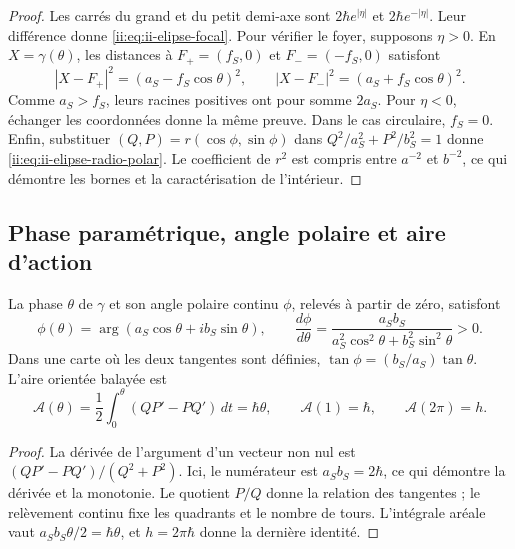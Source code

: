 \begin{proof}
Les carrés du grand et du petit demi-axe sont
\(2\hbar e^{|\eta|}\) et \(2\hbar e^{-|\eta|}\). Leur différence
donne \eqref{ii:eq:ii-elipse-focal}. Pour vérifier le foyer, supposons
\(\eta>0\). En \(X=\gamma(\theta)\), les distances à
\(F_+=(f_S,0)\) et \(F_-=(-f_S,0)\) satisfont
\[
 |X-F_+|^2=(a_S-f_S\cos\theta)^2,\qquad
 |X-F_-|^2=(a_S+f_S\cos\theta)^2.
\]
Comme \(a_S>f_S\), leurs racines positives ont pour somme \(2a_S\).
Pour \(\eta<0\), échanger les coordonnées donne la même preuve.
Dans le cas circulaire, \(f_S=0\). Enfin, substituer
\((Q,P)=r(\cos\phi,\sin\phi)\) dans
\(Q^2/a_S^2+P^2/b_S^2=1\) donne
\eqref{ii:eq:ii-elipse-radio-polar}. Le coefficient de \(r^2\) est
compris entre \(a^{-2}\) et \(b^{-2}\), ce qui démontre les bornes et la
caractérisation de l'intérieur.
\end{proof}

\subsection{Phase paramétrique, angle polaire et aire d'action}
\label{ii:sec:ii-elipse-fase-area}

\begin{proposition}
\label{ii:prop:ii-elipse-area}
La phase \(\theta\) de \(\gamma\) et son angle polaire continu
\(\phi\), relevés à partir de zéro, satisfont
\begin{equation}
 \phi(\theta)=\arg(a_S\cos\theta+i b_S\sin\theta),\qquad
 \frac{d\phi}{d\theta}
 =\frac{a_Sb_S}{a_S^2\cos^2\theta+b_S^2\sin^2\theta}>0.
 \label{ii:eq:ii-elipse-fases}
\end{equation}
Dans une carte où les deux tangentes sont définies,
\(\tan\phi=(b_S/a_S)\tan\theta\). L'aire orientée balayée est
\begin{equation}
 \mathcal A(\theta)=\frac12\int_0^\theta(QP'-PQ')\,dt
 =\hbar\theta,\qquad
 \mathcal A(1)=\hbar,\qquad \mathcal A(2\pi)=h.
 \label{ii:eq:ii-elipse-area-fase}
\end{equation}
\end{proposition}

\begin{proof}
La dérivée de l'argument d'un vecteur non nul est
\((QP'-PQ')/(Q^2+P^2)\). Ici, le numérateur est
\(a_Sb_S=2\hbar\), ce qui démontre la dérivée et la monotonie.
Le quotient \(P/Q\) donne la relation des tangentes ; le relèvement
continu fixe les quadrants et le nombre de tours. L'intégrale aréale
vaut \(a_Sb_S\theta/2=\hbar\theta\), et
\(h=2\pi\hbar\) donne la dernière identité.
\end{proof}

